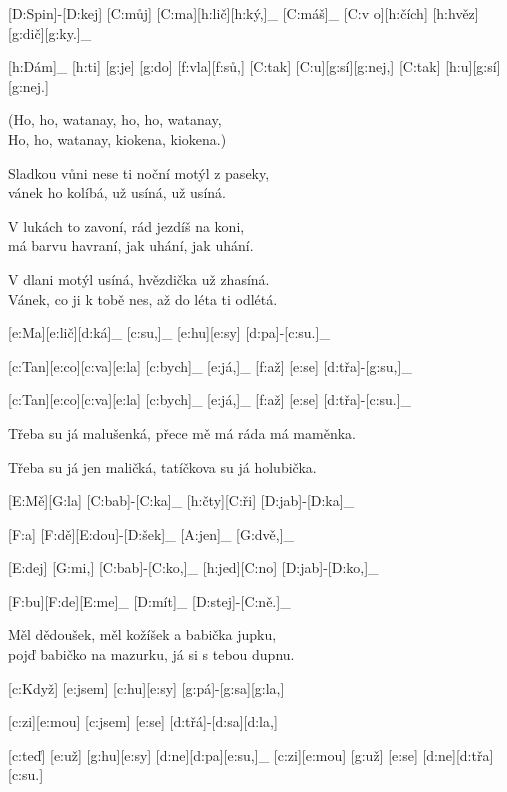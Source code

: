 


[D:Spin]-[D:kej] [C:můj] [C:ma][h:lič][h:ký,]_
[C:máš]_ [C:v o][h:čích] [h:hvěz][g:dič][g:ky.]_

[h:Dám]_ [h:ti] [g:je] [g:do] [f:vla][f:sů,] %
[C:tak] [C:u][g:sí][g:nej,] [C:tak] [h:u][g:sí][g:nej.]

(Ho, ho, watanay, ho, ho, watanay,\\
Ho, ho, watanay, kiokena, kiokena.)

Sladkou vůni nese ti noční motýl z paseky,\\
vánek ho kolíbá, už usíná, už usíná.

V lukách to zavoní, rád jezdíš na koni,\\
má barvu havraní, jak uhání, jak uhání.

V dlani motýl usíná, hvězdička už zhasíná.\\
Vánek, co ji k tobě nes, až do léta ti odlétá.



[e:Ma][e:lič][d:ká]_ [c:su,]_
[e:hu][e:sy] [d:pa]-[c:su.]_

[c:Tan][e:co][c:va][e:la] [c:bych]_ [e:já,]_
[f:až] [e:se] [d:třa]-[g:su,]_

[c:Tan][e:co][c:va][e:la] [c:bych]_ [e:já,]_
[f:až] [e:se] [d:třa]-[c:su.]_

Třeba su já malušenká, přece mě má ráda má maměnka.

Třeba su já jen maličká, tatíčkova su já holubička.



[E:Mě][G:la] [C:bab]-[C:ka]_
[h:čty][C:ři] [D:jab]-[D:ka]_

[F:a] [F:dě][E:dou]-[D:šek]_ [A:jen]_ [G:dvě,]_

[E:dej] [G:mi,] [C:bab]-[C:ko,]_
[h:jed][C:no] [D:jab]-[D:ko,]_

[F:bu][F:de][E:me]_ [D:mít]_ [D:stej]-[C:ně.]_

Měl dědoušek, měl kožíšek a babička jupku,\\
pojď babičko na mazurku, já si s tebou dupnu.



[c:Když] [e:jsem] [c:hu][e:sy] [g:pá]-[g:sa][g:la,]

[c:zi][e:mou] [c:jsem] [e:se] [d:třá]-[d:sa][d:la,]

[c:teď] [e:už] [g:hu][e:sy] [d:ne][d:pa][e:su,]_
[c:zi][e:mou] [g:už] [e:se] [d:ne][d:třa][c:su.]



